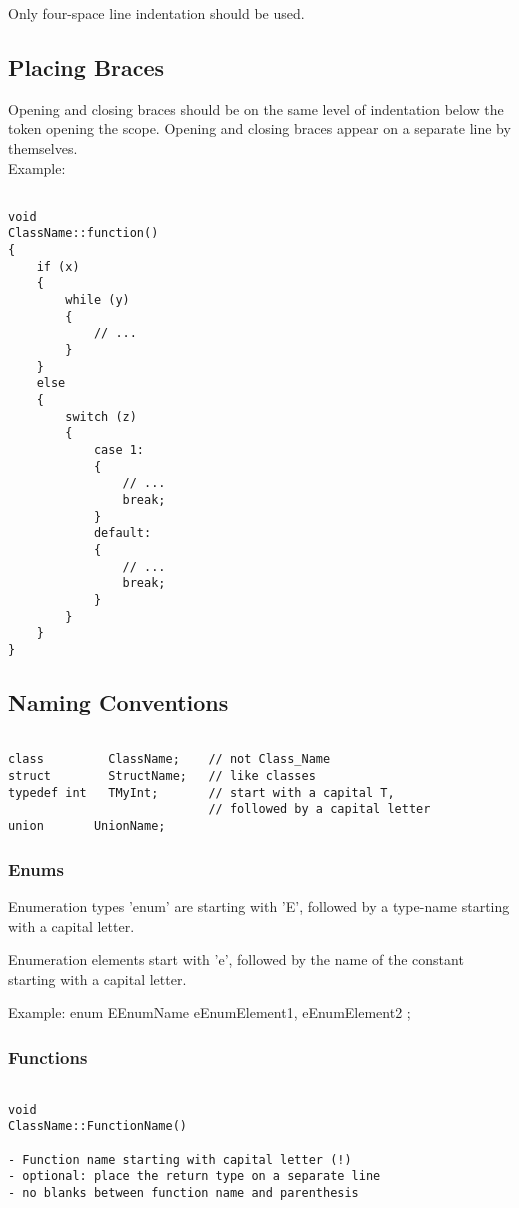 Only four-space line indentation should be used. 

\subsection{Placing Braces}

Opening and closing braces should be on the same level of indentation below the token opening the scope. Opening and closing braces appear on a separate line by themselves.
\\

Example:
\begin{verbatim}

void
ClassName::function()
{
    if (x)
    {
        while (y)
        {
            // ...
        }
    }
    else
    {
        switch (z)
        {
            case 1:
            {
                // ...
                break;
            }
            default:
            {
                // ...
                break;
            }
        }
    }
}

\end{verbatim}
\subsection{Naming Conventions}

\begin{verbatim}

class         ClassName;    // not Class_Name 
struct        StructName;   // like classes
typedef int   TMyInt;       // start with a capital T, 
                            // followed by a capital letter
union		UnionName;    

\end{verbatim}

\subsubsection{Enums}

Enumeration types 'enum' are starting with 'E', followed by a type-name starting with a capital letter.

Enumeration elements start with 'e', followed by the name of the constant starting with a capital letter.

Example:
enum EEnumName
{
    eEnumElement1,
    eEnumElement2
};

\subsubsection{Functions}
\begin{verbatim}

void 
ClassName::FunctionName()

- Function name starting with capital letter (!)
- optional: place the return type on a separate line 
- no blanks between function name and parenthesis

\end{verbatim}

